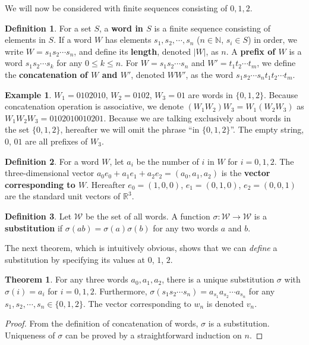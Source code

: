 \documentclass{article}
\theoremstyle{definition}
\newtheorem{theorem}{Theorem}
\newtheorem*{definition}{Definition}
\newtheorem*{example}{Example}
\begin{document}
We will now be considered with finite sequences consisting of $0, 1, 2$.
\begin{definition}
For a set $S$, a \textbf{word in $S$} is a finite sequence consisting of elements in $S$. If a word $W$ has elements $s_1, s_2, \cdots, s_n$ ($n\in \mathbb{N}$, $s_i\in S$) in order, we write  $W=s_1s_2\cdots s_n$, and define its \textbf{length}, denoted $|W|$, as $n$. A \textbf{prefix of $W$} is a word $s_1s_2\cdots s_k$ for any $0\leq k\leq n$. For $W=s_1s_2\cdots s_n$ and $W'=t_1t_2\cdots t_m$, we define the \textbf{concatenation of $W$ and $W'$}, denoted $WW'$, as the word $s_1s_2\cdots s_nt_1t_2\cdots t_m$. 
\end{definition}

\begin{example}
$W_1=0102010$, $W_2=0102$, $W_3=01$ are words in $\{0,1,2\}$. Because concatenation operation is associative, we denote $(W_1W_2)W_3=W_1(W_2W_3)$ as $W_1W_2W_3=0102010010201$. Because we are talking exclusively about words in the set $\{0,1,2\}$, hereafter we will omit the phrase ``in $\{0,1,2\}$''. The empty string, $0$, $01$ are all prefixes of $W_3$.
\end{example}

\begin{definition}
For a word $W$, let $a_i$ be the number of $i$ in $W$ for $i=0,1,2$. The three-dimensional vector $a_0e_0+a_1e_1+a_2e_2=(a_0, a_1, a_2)$ is the \textbf{vector corresponding to $W$}. Hereafter $e_0=(1,0,0)$, $e_1=(0,1,0)$, $e_2=(0,0,1)$ are the standard unit vectors of $\mathbb{R}^3$.
\end{definition}
\begin{definition}
Let $\mathscr{W}$ be the set of all words. A function $\sigma: \mathscr{W}\rightarrow \mathscr{W}$ is a \textbf{substitution} if $\sigma(ab)=\sigma(a)\sigma(b)$ for any two words $a$ and $b$.
\end{definition}

The next theorem, which is intuitively obvious, shows that we can \textit{define} a substitution by specifying its values at $0$, $1$, $2$.

\begin{theorem}
For any three words $a_0, a_1, a_2$, there is a unique substitution $\sigma$ with $\sigma(i)=a_i$ for $i=0,1,2$. Furthermore, $\sigma(s_1s_2\cdots s_n)=a_{s_1}a_{s_2}\cdots a_{s_n}$ for any $s_1, s_2, \cdots, s_n\in\{0,1,2\}$. The vector corresponding to $w_n$ is denoted $v_n$.
\end{theorem}
\begin{proof}
From the definition of concatenation of words, $\sigma$ is a substitution. Uniqueness of $\sigma$ can be proved by a straightforward induction on $n$.
\end{proof}
\end{document}

